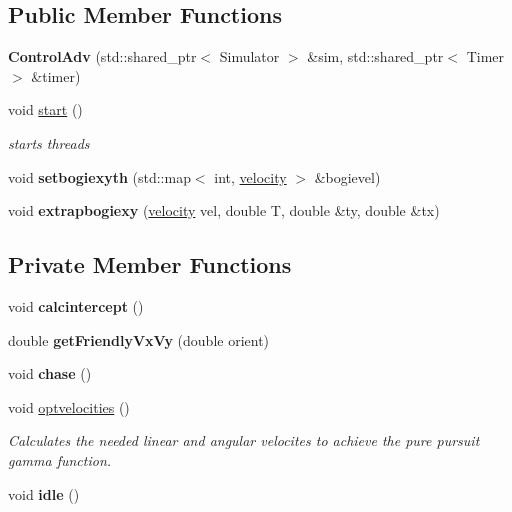 \subsection*{Public Member Functions}
\begin{DoxyCompactItemize}
\item 
\mbox{\label{classControlAdv_ac7548cd0591b7dfbac40b057a7eafa47}} 
{\bfseries Control\+Adv} (std\+::shared\+\_\+ptr$<$ Simulator $>$ \&sim, std\+::shared\+\_\+ptr$<$ Timer $>$ \&timer)
\item 
\mbox{\label{classControlAdv_a6a7d6ff44d04141ace8bda9dc051dae0}} 
void \hyperlink{classControlAdv_a6a7d6ff44d04141ace8bda9dc051dae0}{start} ()
\begin{DoxyCompactList}\small\item\em starts threads \end{DoxyCompactList}\item 
\mbox{\label{classControlAdv_aca6b996dfb7b0633d0e402f0a09f7fdf}} 
void {\bfseries setbogiexyth} (std\+::map$<$ int, \hyperlink{structvelocity}{velocity} $>$ \&bogievel)
\item 
\mbox{\label{classControlAdv_a069aae3738a7fb894acfcd49fb1fc129}} 
void {\bfseries extrapbogiexy} (\hyperlink{structvelocity}{velocity} vel, double T, double \&ty, double \&tx)
\end{DoxyCompactItemize}
\subsection*{Private Member Functions}
\begin{DoxyCompactItemize}
\item 
\mbox{\label{classControlAdv_af959e09368ce3cb3f514df163d56910b}} 
void {\bfseries calcintercept} ()
\item 
\mbox{\label{classControlAdv_a9090a1f95722a0f8da3c6564b954c809}} 
double {\bfseries get\+Friendly\+Vx\+Vy} (double orient)
\item 
\mbox{\label{classControlAdv_acd2da96b69355864cd786643934da6f4}} 
void {\bfseries chase} ()
\item 
\mbox{\label{classControlAdv_a488478a3a2b7cd2f36d5169ad6dd7781}} 
void \hyperlink{classControlAdv_a488478a3a2b7cd2f36d5169ad6dd7781}{optvelocities} ()
\begin{DoxyCompactList}\small\item\em Calculates the needed linear and angular velocites to achieve the pure pursuit gamma function. \end{DoxyCompactList}\item 
\mbox{\label{classControlAdv_a3264e85aeca962cfe7c635a320db865e}} 
void {\bfseries idle} ()
\end{DoxyCompactItemize}
